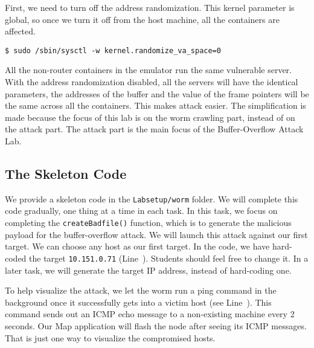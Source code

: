 First, we need to turn off the address randomization. This kernel parameter
is global, so once we turn it off from the host machine, all the containers
are affected. 

\begin{lstlisting}
$ sudo /sbin/sysctl -w kernel.randomize_va_space=0
\end{lstlisting}

All the non-router containers in the emulator run the same vulnerable server. 
With the address randomization disabled, 
all the servers will have the identical parameters, the addresses 
of the buffer and the value of the frame pointers will be the same
across all the containers. This makes attack easier. 
The simplification is made because the 
focus of this lab is on the worm crawling part, instead of on the attack 
part. The attack part is the main focus of the Buffer-Overflow 
Attack Lab.
 


\subsection{The Skeleton Code} 

We provide a skeleton code in the \texttt{Labsetup/worm} 
folder. We will complete this code gradually, one thing 
at a time in each task. In this task, we focus 
on completing the \texttt{createBadfile()} function, 
which is to generate the malicious payload for the 
buffer-overflow attack. 
We will launch this attack against our first target.
We can choose any host as our first target. In the code, we have hard-coded
the target \texttt{10.151.0.71} (Line~\lineone). Students
should feel free to change it. In a later task, 
we will generate the target IP address, instead of 
hard-coding one. 

To help visualize the attack, we let the worm
run a ping command in the background once it successfully gets into a 
victim host (see Line~\linetwo).
This command sends out an ICMP echo message to 
a non-existing machine every 2 seconds. Our Map application
will flash the node after seeing its ICMP messages. 
That is just one way to visualize the compromised hosts.


